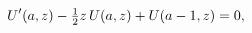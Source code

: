 \[\mathop{U\/}\nolimits'\!\left(a,z\right)-\tfrac{1}{2}z\mathop{U\/}\nolimits\!%
\left(a,z\right)+\mathop{U\/}\nolimits\!\left(a-1,z\right)=0,\]